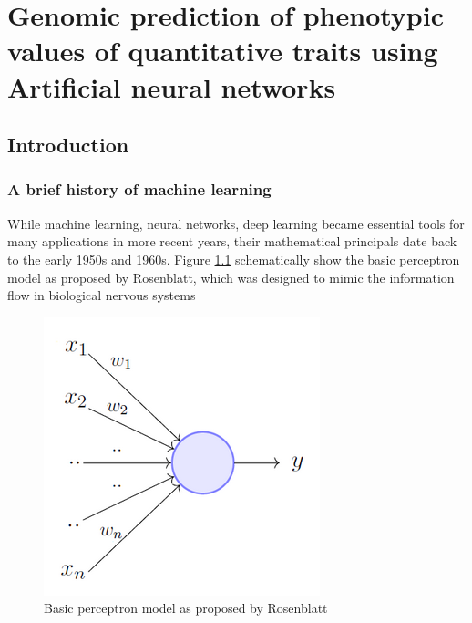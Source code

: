 
\chapter{Genomic prediction of phenotypic values of quantitative traits using Artificial neural networks}

\label{Chapter3} %




\section{Introduction}
\subsection{A brief history of machine learning }

While machine learning, neural networks, deep learning became essential tools for many applications in more recent years,
their mathematical principals date back to the early 1950s and 1960s. Figure \ref{fig:perceptron} schematically  show the
basic perceptron model as proposed by Rosenblatt, which was designed to mimic the information flow in biological nervous systems
\cite{rosenblatt1961}

\begin{figure}[th]
\centering
\includegraphics[height=.25\textheight, width=.5\textwidth]{Figures/perceptron.png}
\decoRule
\caption[Basic perceptron model]{Basic perceptron model as proposed by Rosenblatt}
\label{fig:perceptron}
\end{figure}

